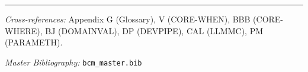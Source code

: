 \nocite{bcm_master}



\vspace{1em}
\hrule
\vspace{0.5em}

\noindent\textit{Cross-references:}
Appendix G (Glossary),
V (CORE-WHEN),
BBB (CORE-WHERE),
BJ (DOMAINVAL),
DP (DEVPIPE),
CAL (LLMMC),
PM (PARAMETH).

\noindent\textit{Master Bibliography:} \texttt{bcm\_master.bib}

